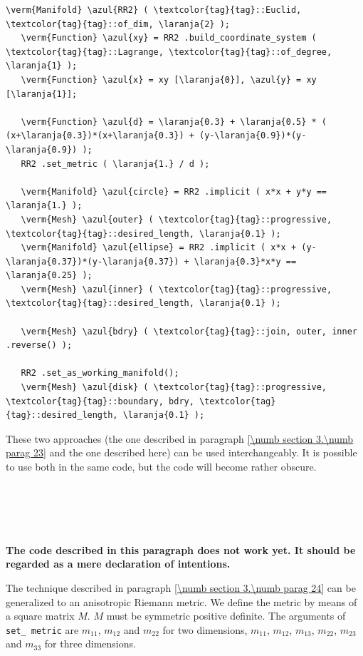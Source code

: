 \begin{Verbatim}[commandchars=\\\{\},formatcom=\small\tt,frame=single,
   label=code not working,rulecolor=\color{coment},
   baselinestretch=0.94,framesep=2mm                                   ]
   \verm{Manifold} \azul{RR2} ( \textcolor{tag}{tag}::Euclid, \textcolor{tag}{tag}::of_dim, \laranja{2} );
   \verm{Function} \azul{xy} = RR2 .build_coordinate_system ( \textcolor{tag}{tag}::Lagrange, \textcolor{tag}{tag}::of_degree, \laranja{1} );
   \verm{Function} \azul{x} = xy [\laranja{0}], \azul{y} = xy [\laranja{1}];

   \verm{Function} \azul{d} = \laranja{0.3} + \laranja{0.5} * ( (x+\laranja{0.3})*(x+\laranja{0.3}) + (y-\laranja{0.9})*(y-\laranja{0.9}) );
   RR2 .set_metric ( \laranja{1.} / d );
   
   \verm{Manifold} \azul{circle} = RR2 .implicit ( x*x + y*y == \laranja{1.} );
   \verm{Mesh} \azul{outer} ( \textcolor{tag}{tag}::progressive, \textcolor{tag}{tag}::desired_length, \laranja{0.1} );
   \verm{Manifold} \azul{ellipse} = RR2 .implicit ( x*x + (y-\laranja{0.37})*(y-\laranja{0.37}) + \laranja{0.3}*x*y == \laranja{0.25} );
   \verm{Mesh} \azul{inner} ( \textcolor{tag}{tag}::progressive, \textcolor{tag}{tag}::desired_length, \laranja{0.1} );

   \verm{Mesh} \azul{bdry} ( \textcolor{tag}{tag}::join, outer, inner .reverse() );

   RR2 .set_as_working_manifold();
   \verm{Mesh} \azul{disk} ( \textcolor{tag}{tag}::progressive, \textcolor{tag}{tag}::boundary, bdry, \textcolor{tag}{tag}::desired_length, \laranja{0.1} );
\end{Verbatim}

These two approaches (the one described in paragraph \ref{\numb section 3.\numb parag 23} and
the one described here) can be used interchangeably.
It is possible to use both in the same code, but the code will become rather obscure.


\section{~~}\label{\numb section 3.\numb parag 25}

{\normalfont\bfseries The code described in this paragraph does not work yet.
It should be regarded as a mere declaration of intentions.}
\medskip

The technique described in paragraph \ref{\numb section 3.\numb parag 24} can be generalized to
an anisotropic Riemann metric.
We define the metric by means of a square matrix $M$.
$M$ must be symmetric positive definite.
The arguments of {\small\tt set\_\,metric} are $ m_{11} $, $ m_{12} $ and $ m_{22} $
for two dimensions,
$ m_{11} $, $ m_{12} $, $ m_{13} $, $ m_{22} $, $ m_{23} $ and $ m_{33} $ for three dimensions.


